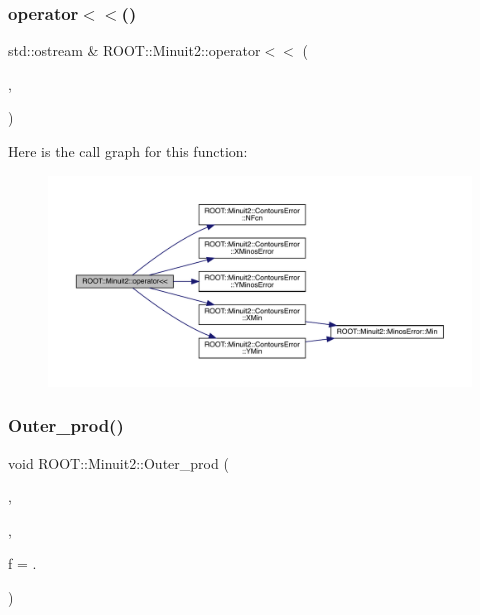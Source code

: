 \subsubsection{\texorpdfstring{operator$<$$<$()}{operator<<()}\hspace{0.1cm}{\footnotesize\ttfamily [11/11]}}
{\footnotesize\ttfamily std\+::ostream \& R\+O\+O\+T\+::\+Minuit2\+::operator$<$$<$ (\begin{DoxyParamCaption}\item[{std\+::ostream \&}]{,  }\item[{const \mbox{\hyperlink{classROOT_1_1Minuit2_1_1ContoursError}{Contours\+Error}} \&}]{ }\end{DoxyParamCaption})}

Here is the call graph for this function\+:
\nopagebreak
\begin{figure}[H]
\begin{center}
\leavevmode
\includegraphics[width=350pt]{d6/d3a/namespaceROOT_1_1Minuit2_a5f32b6f73f8b284fbc74fbf211a7b4ac_cgraph}
\end{center}
\end{figure}
\mbox{\label{namespaceROOT_1_1Minuit2_ac07a37ec0cf04b47c95ddc6943487ef2}} 
\subsubsection{\texorpdfstring{Outer\_prod()}{Outer\_prod()}}
{\footnotesize\ttfamily void R\+O\+O\+T\+::\+Minuit2\+::\+Outer\+\_\+prod (\begin{DoxyParamCaption}\item[{\mbox{\hyperlink{classROOT_1_1Minuit2_1_1LASymMatrix}{L\+A\+Sym\+Matrix}} \&}]{,  }\item[{const \mbox{\hyperlink{classROOT_1_1Minuit2_1_1LAVector}{L\+A\+Vector}} \&}]{,  }\item[{double}]{f = {.} }\end{DoxyParamCaption})}

